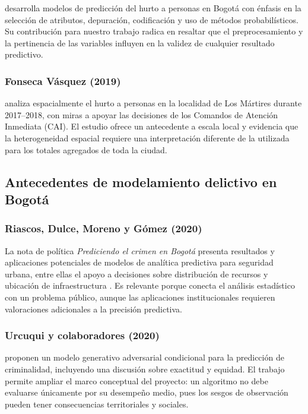 \citet{campo2017} desarrolla modelos de predicción del hurto a personas en Bogotá con énfasis en la selección de atributos, depuración, codificación y uso de métodos probabilísticos. Su contribución para nuestro trabajo radica en resaltar que el preprocesamiento y la pertinencia de las variables influyen en la validez de cualquier resultado predictivo.

\subsubsection{Fonseca Vásquez (2019)}

\citet{fonseca2019} analiza espacialmente el hurto a personas en la localidad de Los Mártires durante 2017--2018, con miras a apoyar las decisiones de los Comandos de Atención Inmediata (CAI). El estudio ofrece un antecedente a escala local y evidencia que la heterogeneidad espacial requiere una interpretación diferente de la utilizada para los totales agregados de toda la ciudad.

\subsection{Antecedentes de modelamiento delictivo en Bogotá}

\subsubsection{Riascos, Dulce, Moreno y Gómez (2020)}

La nota de política \emph{Prediciendo el crimen en Bogotá} presenta resultados y aplicaciones potenciales de modelos de analítica predictiva para seguridad urbana, entre ellas el apoyo a decisiones sobre distribución de recursos y ubicación de infraestructura \citep{riascos2020}. Es relevante porque conecta el análisis estadístico con un problema público, aunque las aplicaciones institucionales requieren valoraciones adicionales a la precisión predictiva.

\subsubsection{Urcuqui y colaboradores (2020)}

\citet{urcuqui2020} proponen un modelo generativo adversarial condicional para la predicción de criminalidad, incluyendo una discusión sobre exactitud y equidad. El trabajo permite ampliar el marco conceptual del proyecto: un algoritmo no debe evaluarse únicamente por su desempeño medio, pues los sesgos de observación pueden tener consecuencias territoriales y sociales.


